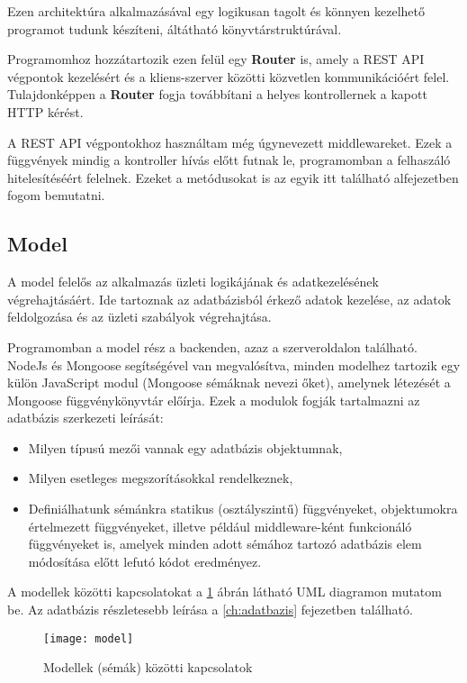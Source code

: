 Ezen architektúra alkalmazásával egy logikusan tagolt és könnyen kezelhető programot tudunk készíteni, áltátható könyvtárstruktúrával.

Programomhoz hozzátartozik ezen felül egy \textbf{Router} is, amely a REST API végpontok kezelésért és a kliens-szerver közötti közvetlen kommunikációért felel. Tulajdonképpen a \textbf{Router} fogja továbbítani a helyes kontrollernek a kapott HTTP kérést.

A REST API végpontokhoz használtam még úgynevezett middlewareket. Ezek a függvények mindig a kontroller hívás előtt futnak le, programomban a felhaszáló hitelesítéséért felelnek. Ezeket a metódusokat is az egyik itt található alfejezetben fogom bemutatni.

\subsection{Model}

A model felelős az alkalmazás üzleti logikájának és adatkezelésének végrehajtásáért. Ide tartoznak az adatbázisból érkező adatok kezelése, az adatok feldolgozása és az üzleti szabályok végrehajtása.

Programomban a model rész a backenden, azaz a szerveroldalon található. NodeJs és Mongoose segítségével van megvalósítva, minden modelhez tartozik egy külön JavaScript modul (Mongoose sémáknak nevezi őket), amelynek létezését a Mongoose függvénykönyvtár előírja. Ezek a modulok fogják tartalmazni az adatbázis szerkezeti leírását:
\begin{itemize}
	\item Milyen típusú mezői vannak egy adatbázis objektumnak,
	\item Milyen esetleges megszorításokkal rendelkeznek,
	\item Definiálhatunk sémánkra statikus (osztályszintű) függvényeket, objektumokra értelmezett függvényeket, illetve például middleware-ként funkcionáló függvényeket is, amelyek minden adott sémához tartozó adatbázis elem módosítása előtt lefutó kódot eredményez.
\end{itemize}

A modellek közötti kapcsolatokat a \ref{fig:model} ábrán látható UML diagramon mutatom be.
Az adatbázis részletesebb leírása a \ref{ch:adatbazis} fejezetben található. 

\begin{figure}[H]
	\centering
	\texttt{[image: model]}
	\caption{Modellek (sémák) közötti kapcsolatok}
	\label{fig:model}
\end{figure}

